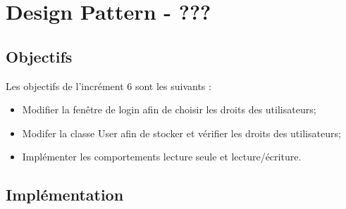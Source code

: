 
\newpage
\section{Design Pattern - ???}

\subsection{Objectifs}

Les objectifs de l'incrément 6 sont les suivants :\\
\begin{itemize}
\item Modifier la fenêtre de login afin de choisir les droits des utilisateurs;
\item Modifer la classe User afin de stocker et vérifier les droits des utilisateurs;
\item Implémenter les comportements lecture seule et lecture/écriture.\\
\end{itemize}

\subsection{Implémentation}